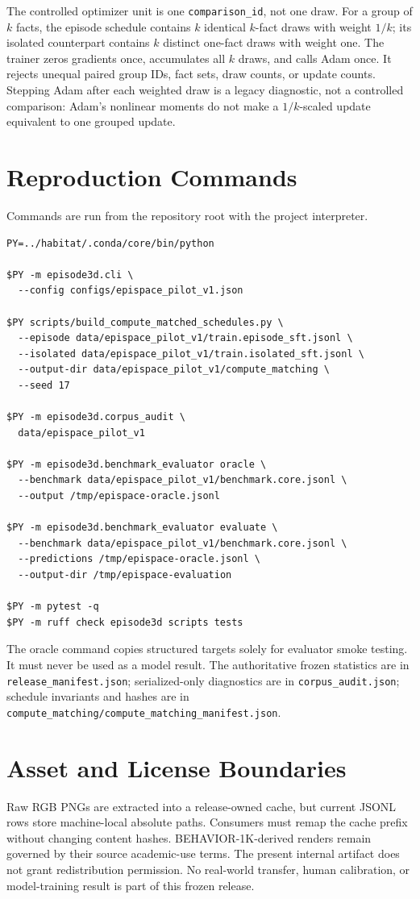 The controlled optimizer unit is one \texttt{comparison\_id}, not one draw.
For a group of $k$ facts, the episode schedule contains $k$ identical $k$-fact
draws with weight $1/k$; its isolated counterpart contains $k$ distinct
one-fact draws with weight one.  The trainer zeros gradients once, accumulates
all $k$ draws, and calls Adam once.  It rejects unequal paired group IDs, fact
sets, draw counts, or update counts.  Stepping Adam after each weighted draw is
a legacy diagnostic, not a controlled comparison: Adam's nonlinear moments do
not make a $1/k$-scaled update equivalent to one grouped update.

\section{Reproduction Commands}
\label{app:commands}

Commands are run from the repository root with the project interpreter.
\begin{verbatim}
PY=../habitat/.conda/core/bin/python

$PY -m episode3d.cli \
  --config configs/epispace_pilot_v1.json

$PY scripts/build_compute_matched_schedules.py \
  --episode data/epispace_pilot_v1/train.episode_sft.jsonl \
  --isolated data/epispace_pilot_v1/train.isolated_sft.jsonl \
  --output-dir data/epispace_pilot_v1/compute_matching \
  --seed 17

$PY -m episode3d.corpus_audit \
  data/epispace_pilot_v1

$PY -m episode3d.benchmark_evaluator oracle \
  --benchmark data/epispace_pilot_v1/benchmark.core.jsonl \
  --output /tmp/epispace-oracle.jsonl

$PY -m episode3d.benchmark_evaluator evaluate \
  --benchmark data/epispace_pilot_v1/benchmark.core.jsonl \
  --predictions /tmp/epispace-oracle.jsonl \
  --output-dir /tmp/epispace-evaluation

$PY -m pytest -q
$PY -m ruff check episode3d scripts tests
\end{verbatim}

The oracle command copies structured targets solely for evaluator smoke
testing.  It must never be used as a model result.  The authoritative frozen
statistics are in \texttt{release\_manifest.json}; serialized-only diagnostics
are in \texttt{corpus\_audit.json}; schedule invariants and hashes are in
\texttt{compute\_matching/compute\_matching\_manifest.json}.

\section{Asset and License Boundaries}
\label{app:license}

Raw RGB PNGs are extracted into a release-owned cache, but current JSONL rows
store machine-local absolute paths.  Consumers must remap the cache prefix
without changing content hashes.  BEHAVIOR-1K-derived renders remain governed
by their source academic-use terms.  The present internal artifact does not
grant redistribution permission.  No real-world transfer, human calibration,
or model-training result is part of this frozen release.
